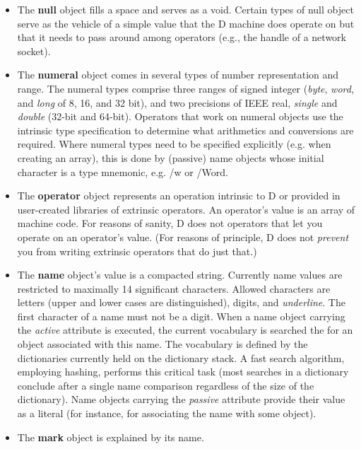 \begin{itemize}

\item The \textbf{null} object fills a space and serves as a void. Certain types of null object serve as the vehicle of a simple value that the D machine does operate on but that it needs to pass around among operators (e.g., the handle of a network socket).

\item The  \textbf{numeral} object comes in several types of number representation and range. The  numeral types comprise three ranges of signed integer (\emph{byte}, \emph{word}, and \emph{long} of 8, 16, and 32 bit), and two precisions of IEEE real, \emph{single} and \emph{double} (32-bit and 64-bit). Operators that work on  numeral  objects use the intrinsic type specification to determine what arithmetics and conversions are required.  Where numeral types need to  be specified explicitly (e.g. when creating an array),  this is done by (passive) name objects whose  initial character is a type mnemonic, e.g. /w or /Word.

\item The \textbf{operator} object represents an operation intrinsic to D or  provided in user-created libraries of extrinsic operators. An operator's value is an array of machine code. For reasons of sanity, D does not  operators that let you operate on an operator's value. (For reasons of principle, D does not \emph{prevent} you from writing extrinsic operators that do just that.)

\item The  \textbf{name} object's value is a compacted string. Currently name values are restricted to maximally 14 significant characters. Allowed characters are letters (upper and lower cases are distinguished), digits, and \emph{underline}. The first character of a name must not be a digit. When a name  object carrying the \emph{active} attribute is executed, the current vocabulary is searched the  for an object associated with this name. The vocabulary is defined by the dictionaries currently held on the dictionary stack. A fast search  algorithm,  employing hashing,  performs  this  critical task (most searches in a dictionary conclude  after  a single name comparison regardless of the size of the dictionary). Name objects carrying the \emph{passive} attribute provide their value as a literal (for instance, for associating the name with some object).

\item The \textbf{mark} object is explained by its name.


\end{itemize}
